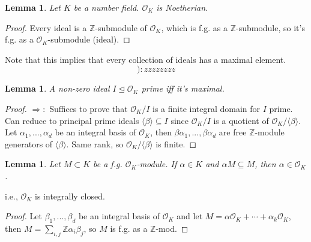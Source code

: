 \documentclass{article}
\theoremstyle{definition}
\theoremstyle{remark}
\theoremstyle{plain}
\newtheorem{lem}[defn]{Lemma}
\newcommand{\ZZ}{\mathbb{Z}}
\begin{document}
\begin{lem}
    Let $K$ be a number field. $\mathcal O_K$ is Noetherian.
\end{lem}
\begin{proof}
    Every ideal is a $\ZZ$-submodule of $\mathcal O_K$, which is f.g. as a $\ZZ$-submodule, so it's f.g. as a $\mathcal O_K$-submodule (ideal).
\end{proof}
Note that this implies that every collection of ideals has a maximal element.
\[):zzzzzzzz\tag{Owen's Signature}\]
\begin{lem}
    A non-zero ideal $I\trianglelefteq\mathcal O_K$ prime iff it's maximal.
\end{lem}
\begin{proof}
    $\Rightarrow:$ Suffices to prove that $\mathcal O_K/I$ is a finite integral domain for $I$ prime. Can reduce to principal prime ideals $\langle\beta\rangle\subseteq I$ since $\mathcal O_K/I$ is a quotient of $\mathcal O_K/\langle\beta\rangle$. Let $\alpha_1,...,\alpha_d$ be an integral basis of $\mathcal O_K$, then $\beta\alpha_1,...,\beta\alpha_d$ are free $\ZZ$-module generators of $\langle\beta\rangle$. Same rank, so $\mathcal O_K/\langle\beta\rangle$ is finite.
\end{proof}
\begin{lem}
    Let $M\subset K$ be a f.g. $\mathcal O_K$-module. If $\alpha\in K$ and $\alpha M\subseteq M$, then $\alpha\in\mathcal O_K$.
\end{lem}
i.e., $\mathcal O_K$ is integrally closed.
\begin{proof}
    Let  $\beta_1,...,\beta_d$ be an integral basis of $\mathcal O_K$ and let $M=\alpha\mathcal O_K+\cdots+\alpha_k\mathcal O_K$, then $M=\sum_{i,j}\ZZ\alpha_i\beta_j$, so $M$ is f.g. as a $\ZZ$-mod.
\end{proof}
\end{document}
